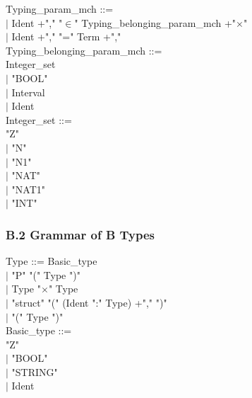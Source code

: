 \documentclass[12pt,a4paper,draft]{article}
\begin{document}
{\begin{sloppypar}
Typing\_param\_mch ::= \\ 
\hspace*{0.20in} $|$ Ident +","   "$\in$"  Typing\_belonging\_param\_mch +"$\times$"\\ 
\hspace*{0.20in} $|$ Ident +","   "="  Term +","\\ 
Typing\_belonging\_param\_mch ::= \\ 
\hspace*{0.20in}   Integer\_set\\ 
\hspace*{0.20in} $|$ "BOOL" \\ 
\hspace*{0.20in} $|$  Interval\\ 
\hspace*{0.20in} $|$ Ident \\ 
Integer\_set ::= \\ 
\hspace*{0.20in}  "Z"\\ 
\hspace*{0.20in} $|$ "N" \\ 
\hspace*{0.20in} $|$ "N1" \\ 
\hspace*{0.20in} $|$ "NAT" \\ 
\hspace*{0.20in} $|$ "NAT1" \\ 
\hspace*{0.20in} $|$ "INT" \\ 
\end{sloppypar} 
}

\subsubsection{B.2 Grammar of B Types }
\footnotesize{
\begin{sloppypar} 

Type ::=  Basic\_type\\ 
 \hspace*{0.20in} $|$ "P"  "(" Type ")" \\ 
 \hspace*{0.20in} $|$  Type  "$\times$"  Type \\ 
\hspace*{0.20in} $|$ "struct" "(" (Ident ":" Type) +"," ")" \\ 
\hspace*{0.20in} $|$ "(" Type ")" \\ 
Basic\_type ::= \\ 
\hspace*{0.20in}  "Z" \\ 
\hspace*{0.20in} $|$ "BOOL"\\ 
\hspace*{0.20in} $|$ "STRING"\\ 
\hspace*{0.20in} $|$ Ident \\


\end{sloppypar} 
}
\end{document}
